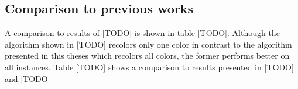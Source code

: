 \subsection{Comparison to previous works}
A comparison to results of [TODO] is shown in table [TODO]. Although the algorithm shown in [TODO] recolors only one color in contrast to the algorithm presented in this theses which recolors all colors, the former performs better on all instances. Table [TODO] shows a comparison to results presented in [TODO] and [TODO]
